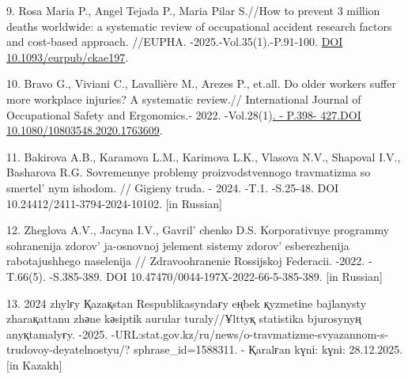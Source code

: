 \begin{refs}
9. Rosa Maria P., Angel Tejada P., Maria Pilar S.//How to prevent 3
million deaths worldwide: a systematic review of occupational accident
research factors and cost-based approach. //EUPHA.
-2025.-Vol.35(1).-P.91-100.
\href{https://doi.org/10.1093/eurpub/ckae197}{DOI
10.1093/eurpub/ckae197}.

10. Bravo G., Viviani C., Lavallière M., Arezes P., et.all. Do older
workers suffer more workplace injuries? A systematic review.//
International Journal of Occupational Safety and Ergonomics.-
2022. -Vol.28(1)\href{https://doi.org/10.1080/10803548.2020.1763609}{. -
P.398- 427.DOI 10.1080/10803548.2020.1763609}.

11. Bakirova A.B., Karamova L.M., Karimova L.K., Vlasova N.V., Shapoval
I.V., Basharova R.G. Sovremennye problemy proizvodstvennogo travmatizma
so smertel' nym ishodom. // Gigieny truda. - 2024. -T.1.
-S.25-48. DOI 10.24412/2411-3794-2024-10102. {[}in Russian{]}

12. Zheglova A.V., Jacyna I.V., Gavril' chenko D.S.
Korporativnye programmy sohranenija zdorov' ja-osnovnoj
jelement sistemy zdorov' esberezhenija rabotajushhego
naselenija // Zdravoohranenie Rossijskoj Federacii. -2022. -T.66(5).
-S.385-389. DOI 10.47470/0044-197X-2022-66-5-385-389. {[}in Russian{]}

13. 2024 zhylғy Қazaқstan Respublikasyndaғy eңbek қyzmetіne bajlanysty
zharaқattanu zhәne kәsіptіk aurular turaly//Ұlttyқ statistika bjurosynyң
anyқtamalyғy. -2025.
-URL:stat.gov.kz/ru/news/o-travmatizme-svyazannom-s-trudovoy-deyatelnostyu/?
sphrase\_id=1588311. - Қaralғan kүnі: kүnі: 28.12.2025. {[}in Kazakh{]}
\end{refs}

